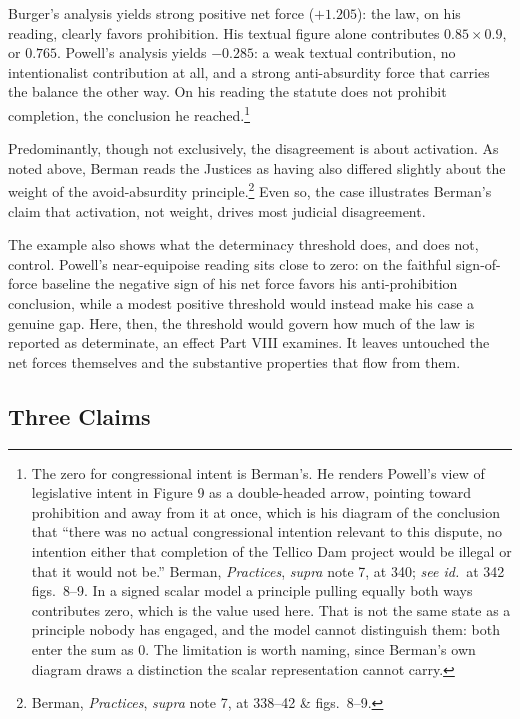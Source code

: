 Burger's analysis yields strong positive net force ($+1.205$): the law,
on his reading, clearly favors prohibition. His textual figure alone
contributes $0.85 \times 0.9$, or $0.765$. Powell's analysis yields $-0.285$: a weak textual contribution, no intentionalist
contribution at all, and a strong anti-absurdity force that carries the
balance the other way. On his reading the statute does not prohibit
completion, the conclusion he reached.\footnote{The zero for
congressional intent is Berman's. He renders Powell's view of legislative
intent in Figure 9 as a double-headed arrow, pointing toward prohibition
and away from it at once, which is his diagram of the conclusion that
``there was no actual congressional intention relevant to this dispute, no
intention either that completion of the Tellico Dam project would be
illegal or that it would not be.'' Berman, \textit{Practices},
\textit{supra} note 7, at 340; \textit{see id.}\ at 342 figs.\ 8--9. In a
signed scalar model a principle pulling equally both ways contributes zero,
which is the value used here. That is not the same state as a principle
nobody has engaged, and the model cannot distinguish them: both enter the
sum as $0$. The limitation is worth naming, since Berman's own diagram
draws a distinction the scalar representation cannot carry.}

Predominantly, though not exclusively, the disagreement is about activation.
As noted above, Berman reads the Justices as having also
differed slightly about the weight of the avoid-absurdity principle.\footnote{Berman, \textit{Practices}, \textit{supra} note 7, at 338--42 \& figs.\ 8--9.} Even so, the case illustrates Berman's claim that activation, not weight,
drives most judicial disagreement.

The example also shows what the determinacy threshold does, and does not,
control. Powell's near-equipoise reading sits close to zero: on the
faithful sign-of-force baseline the negative sign of his net force favors his
anti-prohibition conclusion, while a modest positive threshold would
instead make his case a genuine gap. Here, then, the threshold would govern how much of the law is reported as
determinate, an effect Part VIII examines. It leaves untouched the
net forces themselves and the substantive properties that flow from them.

\subsection{Three Claims}

